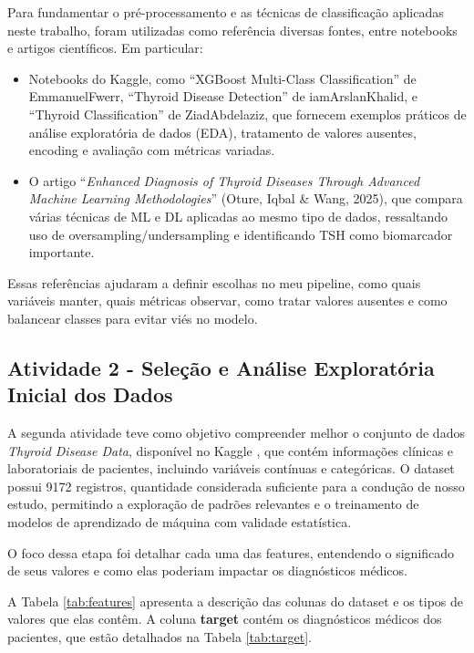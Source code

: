 \documentclass[11pt]{article}
\begin{document}
Para fundamentar o pré-processamento e as técnicas de classificação aplicadas neste trabalho, foram utilizadas como referência diversas fontes, entre notebooks e artigos científicos. Em particular:

\begin{itemize}
  \item Notebooks do Kaggle, como “XGBoost Multi-Class Classification” de EmmanuelFwerr, “Thyroid Disease Detection” de iamArslanKhalid, e “Thyroid Classification” de ZiadAbdelaziz, que fornecem exemplos práticos de análise exploratória de dados (EDA), tratamento de valores ausentes, encoding e avaliação com métricas variadas.
  \item O artigo “\textit{Enhanced Diagnosis of Thyroid Diseases Through Advanced Machine Learning Methodologies}” (Oture, Iqbal \& Wang, 2025), que compara várias técnicas de ML e DL aplicadas ao mesmo tipo de dados, ressaltando uso de oversampling/undersampling e identificando TSH como biomarcador importante. \cite{oture2025enhanced} 
\end{itemize}

Essas referências ajudaram a definir escolhas no meu pipeline, como quais variáveis manter, quais métricas observar, como tratar valores ausentes e como balancear classes para evitar viés no modelo.

\subsection{Atividade 2 - Seleção e Análise Exploratória Inicial dos Dados}

A segunda atividade teve como objetivo compreender melhor o conjunto de dados \textit{Thyroid Disease Data}, disponível no Kaggle \cite{thyroid-dataset}, que contém informações clínicas e laboratoriais de pacientes, incluindo variáveis contínuas e categóricas. O dataset possui 9172 registros, quantidade considerada suficiente para a condução de nosso estudo, permitindo a exploração de padrões relevantes e o treinamento de modelos de aprendizado de máquina com validade estatística.


O foco dessa etapa foi detalhar cada uma das features, entendendo o significado de seus valores e como elas poderiam impactar os diagnósticos médicos. 

A Tabela \ref{tab:features} apresenta a descrição das colunas do dataset e os tipos de valores que elas contêm.
A coluna \textbf{target} contém os diagnósticos médicos dos pacientes, que estão detalhados na Tabela \ref{tab:target}.  
\end{document}
